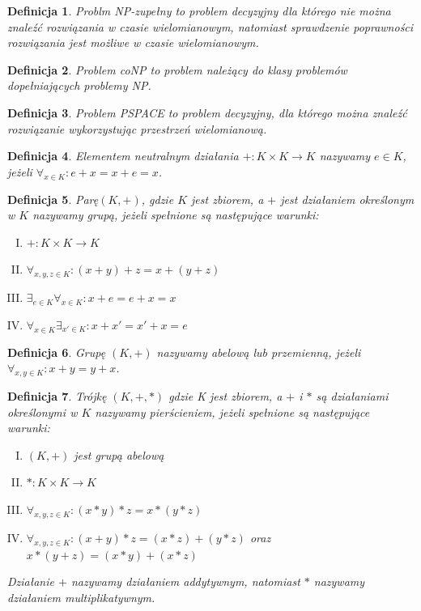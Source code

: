 \documentclass[12pt,a4paper]{article}
\newtheorem{df}{Definicja}[section]
\begin{document}
\begin{df}
Problm NP-zupe{\l}ny to problem decyzyjny dla kt\'orego nie mo\.zna znale\'z\'c rozwi\k{a}zania w czasie wielomianowym, natomiast sprawdzenie poprawno\'sci rozwi\k{a}zania jest mo\.zliwe w czasie wielomianowym. 
\end{df}
\begin {df} 
Problem coNP to problem nale\.z\k{a}cy do klasy problem\'ow dope{\l}niaj\k{a}cych problemy NP.
\end{df}
\begin{df}
Problem PSPACE to problem decyzyjny, dla kt\'orego mo\.zna znale\'z\'c rozwi\k{a}zanie wykorzystuj\k{a}c przestrze\'n wielomianow\k{a}.
\end{df}
\begin{df} 
Elementem neutralnym dzia{\l}ania $+:K\times K\rightarrow K$ nazywamy $e\in K$, je\.zeli $\forall_{x\in K}:e+x=x+e=x$.
\end{df}
\begin{df} 
Par\k{e}$(K,+)$, gdzie $K$ jest zbiorem, a $+$ jest dzia{\l}aniem okre\'slonym w $K$ nazywamy grup\k{a}, je\.zeli spe{\l}nione s\k{a} nast\k{e}puj\k{a}ce warunki:
\begin{enumerate}[I.]
\item $+: K\times K \rightarrow K$
\item $\forall_{x,y,z\in K}: (x+y)+z=x+(y+z)$
\item $\exists_{e\in K} \forall_{x\in K}: x+e=e+x=x$ 
\item $\forall_{x\in K} \exists_{x'\in K}: x+x'=x'+x=e$
\end{enumerate}
\end{df}
\begin{df} 
Grup\k{e} $(K,+)$ nazywamy abelow\k{a} lub przemienn\k{a}, je\.zeli $\forall_{x,y\in K}: x+y=y+x$.
\end{df}
\begin{df} 
Tr\'ojk\k{e} $(K,+,*)$ gdzie K jest zbiorem, a $+$ i $*$ s\k{a} dzia{\l}aniami okre\'slonymi w $K$ nazywamy pier\'scieniem, je\.zeli spe{\l}nione s\k{a} nast\k{e}puj\k{a}ce warunki:
\begin{enumerate}[I.]
\item $(K,+)$ jest grup\k{a} abelow\k{a} 
\item $*:K\times K \rightarrow K$ 
\item $\forall_{x,y,z\in K}: (x*y)*z=x*(y*z)$
\item $\forall_{x,y,z\in K}: (x+y)*z=(x*z)+(y*z)$ oraz $x*(y+z)=(x*y)+(x*z)$
\end{enumerate}
Dzia{\l}anie $+$ nazywamy dzia{\l}aniem addytywnym, natomiast $*$ nazywamy dzia{\l}aniem multiplikatywnym.
\end{df}
\end{document}
